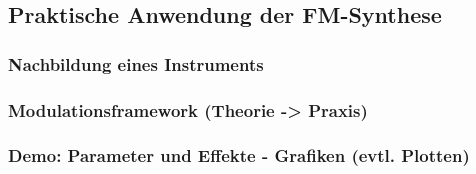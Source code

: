 \subsection{Praktische Anwendung der FM-Synthese}
\subsubsection{Nachbildung eines Instruments}
\subsubsection{Modulationsframework (Theorie -> Praxis)}
\subsubsection{Demo: Parameter und Effekte - Grafiken (evtl. Plotten)}